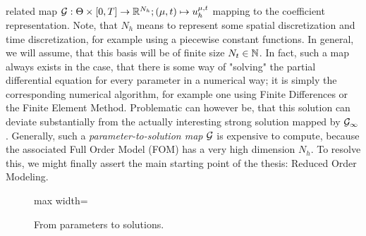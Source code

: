related map $\mathcal{G}: \Theta \times [0, T] \to \mathbb{R}^{N_h}; (\mu, t) \mapsto u_h^{\mu, t}$ 
mapping to the coefficient representation.
Note, that $N_h$ means to represent some spatial discretization and time discretization, for
example using a piecewise constant functions. In general, we will assume, that this basis will be
of finite size $N_t \in \mathbb{N}$. 
In fact, such a map always exists in the case, that
there is some way of "solving" the partial differential equation for every parameter in a numerical way; it is simply 
the corresponding numerical algorithm, for example one using Finite Differences or the Finite Element Method. 
Problematic can however be, that this solution can deviate substantially from the actually interesting strong
solution mapped by $\mathcal{G}_\infty$.
Generally, such a \emph{parameter-to-solution map} $\mathcal{G}$ is expensive to compute, because the associated Full Order Model (FOM)
has a very high dimension $N_h$. To resolve this, we might finally assert the main starting point of the thesis:
Reduced Order Modeling.

\begin{figure}[H]
    \centering
    \begin{adjustbox}{max width=\linewidth}
    \end{adjustbox}
    \caption{From parameters to solutions.}
    \label{fig:parameters-to-solutions}
  \end{figure}
  

